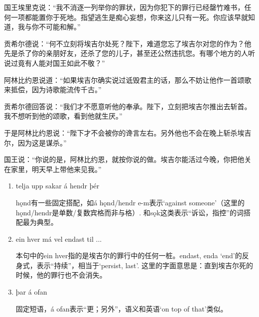 \begin{translation*}{}
  国王埃里克说：“我不消逐一列举你的罪状，因为你犯下的罪行已经罄竹难书，任何一项都能置你于死地。指望逃生是痴心妄想，你来这儿只有一死。你应该早就知道，我与你不可能和解。”

  贡希尔德说：“何不立刻将埃吉尔处死？陛下，难道您忘了埃吉尔对您的作为？他先是杀了你的亲朋好友，还杀了您的儿子，甚至还公然违抗您。有哪个地方的人听说过竟有人能对国王如此不敬？”

  阿林比约恩说道：“如果埃吉尔确实说过诋毁君主的话，那么不妨让他作一首颂歌来抵偿，因为诗歌能流传千古。”

  贡希尔德回答说：“我们才不愿意听他的奉承。陛下，立刻把埃吉尔推出去斩首。我不想听到他的颂歌，看到他就生厌。”

  于是阿林比约恩说：“陛下才不会被你的谗言左右。另外他也不会在晚上斩杀埃吉尔，因为这是谋杀。”

  国王说：“你说的是，阿林比约恩，就按你说的做。埃吉尔能活过今晚，你把他关在家里，明天早上带他来见我。”

\end{translation*}
\begin{grammar*}{}
  \begin{enumerate}[leftmargin=*]
    \item telja upp sakar á hendr þér

          hǫnd有一些固定搭配，如á hǫnd/hendr e-m表示`against someone'（这里的hǫnd/hendr是单数/复数宾格而非与格）. 和sǫk这类表示“诉讼，指控”的词搭配最为典型。

    \item ein hver má vel endast til ...

          本句中的ein hver指的是埃吉尔的罪行中的任何一桩。endast, enda `end'的反身式，表示“持续”，相当于`persist, last'. 这里的字面意思是：直到埃吉尔死的时候，他的罪行也不会消失。

    \item þar á ofan

          固定短语，á ofan表示“更；另外”，语义和英语`on top of that'类似。
  \end{enumerate}
\end{grammar*}

